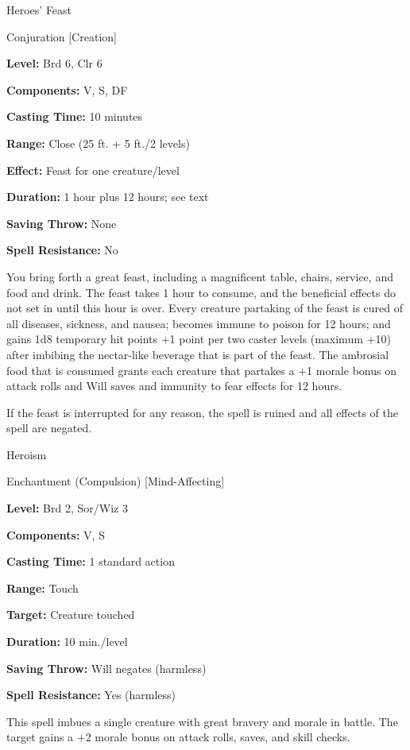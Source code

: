 \documentclass{article}
\begin{document}
\vspace{12pt}
Heroes' Feast

Conjuration [Creation]

\textbf{Level:} Brd 6, Clr 6

\textbf{Components:} V, S, DF

\textbf{Casting Time:} 10 minutes

\textbf{Range:} Close (25 ft. + 5 ft./2 levels)

\textbf{Effect:} Feast for one creature/level

\textbf{Duration:} 1 hour plus 12 hours; see text

\textbf{Saving Throw:} None

\textbf{Spell Resistance:} No

You bring forth a great feast, including a magnificent table, chairs, service, 
and food and drink. The feast takes 1 hour to consume, and the beneficial effects 
do not set in until this hour is over. Every creature partaking of the feast is 
cured of all diseases, sickness, and nausea; becomes immune to poison for 12 hours; 
and gains 1d8 temporary hit points +1 point per two caster levels (maximum +10) 
after imbibing the nectar-like beverage that is part of the feast. The ambrosial 
food that is consumed grants each creature that partakes a +1 morale bonus on attack 
rolls and Will saves and immunity to fear effects for 12 hours.

If the feast is interrupted for any reason, the spell is ruined and all effects 
of the spell are negated.

\vspace{12pt}
Heroism

Enchantment (Compulsion) [Mind-Affecting]

\textbf{Level:} Brd 2, Sor/Wiz 3

\textbf{Components:} V, S

\textbf{Casting Time:} 1 standard action

\textbf{Range:} Touch

\textbf{Target:} Creature touched

\textbf{Duration:} 10 min./level

\textbf{Saving Throw: }Will negates (harmless)

\textbf{Spell Resistance:} Yes (harmless)

This spell imbues a single creature with great bravery and morale in battle. The 
target gains a +2 morale bonus on attack rolls, saves, and skill checks.
\end{document}
